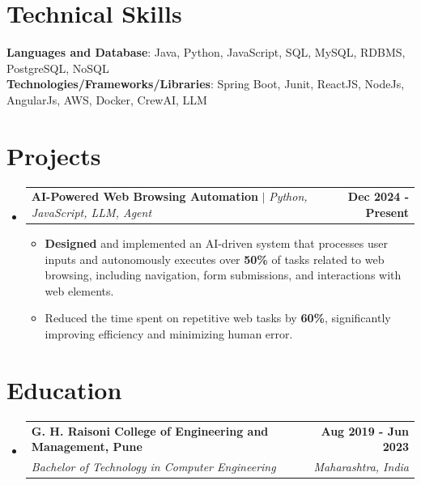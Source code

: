 \documentclass[letterpaper,11pt]{article}
\makeatletter
\newcommand{\resumeItem}[1]{
  \item\small{
	{#1 \vspace{-3pt}}
  }
}
\newcommand{\resumeSubheading}[4]{
  \vspace{-3pt}\item
	\begin{tabular*}{1.0\textwidth}[t]{l@{\extracolsep{\fill}}r}
  	\textbf{#1} & \textbf{\small #2} \\
  	\textit{\small#3} & \textit{\small #4} \\
	\end{tabular*}\vspace{-8pt}
}
\newcommand{\resumeProjectHeading}[2]{
	\item
	\begin{tabular*}{1.001\textwidth}{l@{\extracolsep{\fill}}r}
  	\small#1 & \textbf{\small #2}\\
	\end{tabular*}\vspace{-8pt}
}
\newcommand{\resumeSubHeadingListStart}{\begin{itemize}[leftmargin=0.0in, label={}]}
\newcommand{\resumeSubHeadingListEnd}{\end{itemize}}
\newcommand{\resumeItemListStart}{\begin{itemize}}
\newcommand{\resumeItemListEnd}{\end{itemize}\vspace{-6pt}}
\makeatother
\begin{document}
\section{Technical Skills}
 \begin{itemize}[leftmargin=0.15in, label={}]
	\small{\item{
 	\textbf{Languages and Database}{: Java, Python, JavaScript, SQL, MySQL, RDBMS, PostgreSQL, NoSQL} \\
 	\textbf{Technologies/Frameworks/Libraries}{: Spring Boot, Junit, ReactJS, NodeJs, AngularJs, AWS, Docker, CrewAI, LLM}
	}}
 \end{itemize}
 \vspace{-18pt}

\section{Projects}
	\vspace{-5pt}
	\resumeSubHeadingListStart
	\resumeProjectHeading
      	{\textbf{AI-Powered Web Browsing Automation} $|$ \emph{Python, JavaScript, LLM, Agent}}{Dec 2024 - Present}
      	\resumeItemListStart
        	\resumeItem{\textbf{Designed} and implemented an AI-driven system that processes user inputs and autonomously executes over \textbf{50\%} of tasks related to web browsing, including navigation, form submissions, and interactions with web elements.}
        	\resumeItem{Reduced the time spent on repetitive web tasks by \textbf{60\%}, significantly improving efficiency and minimizing human error.}
      	\resumeItemListEnd
	\resumeSubHeadingListEnd
\vspace{-17pt}

\section{Education}
  \resumeSubHeadingListStart
	\resumeSubheading
  	{G. H. Raisoni College of Engineering and Management, Pune}{Aug 2019 - Jun 2023}
  	{Bachelor of Technology in Computer Engineering}{Maharashtra, India}
  \resumeSubHeadingListEnd
\end{document}
